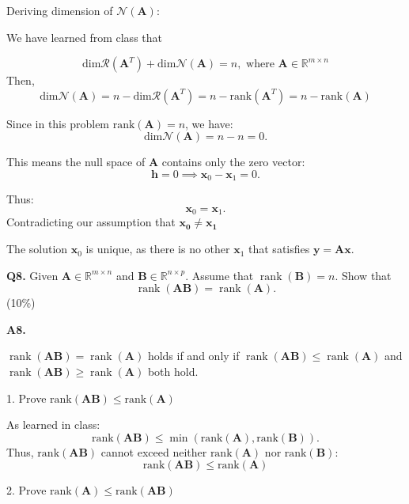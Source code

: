 \documentclass[12pt]{article}
\newcommand{\bmat}[1]{\mathbf{#1}} %
\begin{document}
Deriving dimension of $\mathcal{N}(\bmat{A})$:


We have learned from class that

\[
\text{dim}\mathcal{R}(\bmat{A}^T) + \text{dim}\mathcal{N}(\bmat{A}) = n, \text{ where } \bmat{A} \in \mathbb{R}^{m\times n}
\]
Then,
\[
\text{dim}\mathcal{N}(\bmat{A}) = n-\text{dim}\mathcal{R}(\bmat{A}^T) = n -\text{rank}(\bmat{A}^T)
= n -\text{rank}(\bmat{A})
\]

Since in this problem \( \text{rank}(\mathbf{A}) = n \), we have:
\[
\text{dim}\mathcal{N}( \mathbf{A}) = n - n = 0.
\]

This means the null space of \( \mathbf{A} \) contains only the zero vector:
\[
\mathbf{h} = 0 \implies \mathbf{x}_0 - \mathbf{x}_1 = 0.
\]

Thus:
\[
\mathbf{x}_0 = \mathbf{x}_1.
\]
Contradicting our assumption that $\bmat{x_0} \neq \bmat{x_1}$

The solution \( \mathbf{x}_0 \) is unique, as there is no other \( \mathbf{x}_1 \) that satisfies \( \mathbf{y} = \mathbf{A}\mathbf{x} \).

\vspace{\baselineskip}
\hline
\vspace{\baselineskip}

\textbf{Q8.} Given \( \bmat{A} \in \mathbb{R}^{m \times n} \) and \( \bmat{B} \in \mathbb{R}^{n \times p} \). Assume that \( \operatorname{rank}(\bmat{B}) = n \). Show that
\[
\operatorname{rank}(\bmat{A}\bmat{B}) = \operatorname{rank}(\bmat{A}).
\] \hfill (10\%)

\vspace{\baselineskip}
\textbf{A8.}

$\operatorname{rank}(\bmat{A}\bmat{B}) = \operatorname{rank}(\bmat{A})$ holds if and only if
$\operatorname{rank}(\bmat{A}\bmat{B}) \le \operatorname{rank}(\bmat{A})$ and
$\operatorname{rank}(\bmat{A}\bmat{B}) \ge \operatorname{rank}(\bmat{A})$ both hold.
\vspace{\baselineskip}

1. Prove $\text{rank}(\mathbf{AB}) \leq \text{rank}(\mathbf{A})$

As learned in class:
\[
\text{rank}(\mathbf{AB}) \leq \min(\text{rank}(\mathbf{A}), \text{rank}(\mathbf{B})).
\]
Thus, $\text{rank}(\bmat{AB})$ cannot exceed neither $\text{rank}(\bmat{A})$ nor $\text{rank}(\bmat{B})$:
\[
\text{rank}(\mathbf{AB}) \leq \text{rank}(\mathbf{A})
\]
\vspace{\baselineskip}

2. Prove \( \text{rank}(\bmat{A}) \leq \text{rank}(\bmat{AB}) \)
\vspace{\baselineskip}
\end{document}
